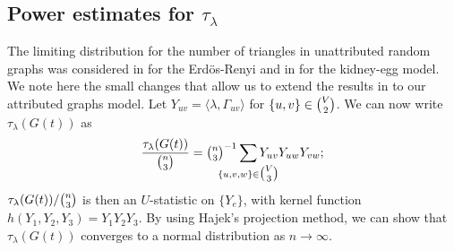 \documentclass[10pt,journal,compsoc]{IEEEtran}
\theoremstyle{definition}
\def\clap#1{\hbox to 0pt{\hss#1\hss}}
\def\mathclap{\mathpalette\mathclapinternal}
\def\mathclapinternal#1#2{%
\clap{$\mathsurround=0pt#1{#2}$}%
}
\begin{document}
\subsection{Power estimates for $\tau_{\lambda}$}
\label{sec:power-estim-tau_l}
The limiting distribution for the number of triangles in unattributed
random graphs was considered in
\cite{nowicki88:_subgr_u_statis_method} for the Erd\"{o}s-Renyi and in
\cite{rukhin09:_asymp_analy_various_statis_random_graph_infer} for the
kidney-egg model. We note here the small changes that allow us to
extend the results in
\cite{rukhin09:_asymp_analy_various_statis_random_graph_infer,%
nowicki88:_subgr_u_statis_method} to our attributed graphs model. Let
$Y_{uv} = \langle \lambda, \Gamma_{uv} \rangle$ for $\{u,v\} \in
\tbinom{V}{2}$. We can now write $\tau_{\lambda}(G(t))$ as
\begin{equation}
  \label{eq:45}
  \frac{\tau_{\lambda}(G(t))}{\tbinom{n}{3}} = \tbinom{n}{3}^{-1}
  \sum_{\mathclap{\{u,v,w\} \in \tbinom{V}{3}}} Y_{uv} Y_{uw} Y_{vw};
\end{equation}
$\tau_{\lambda}(G(t))/\tbinom{n}{3}$ is then an
$U$-statistic on $\{Y_{e}\}$, with kernel function $h(Y_{1}, Y_{2},
Y_{3}) = Y_{1} Y_{2} Y_{3}$. By using Hajek's projection method, we
can show that $\tau_{\lambda}(G(t))$ converges to a normal
distribution as $n \rightarrow \infty$. 
\end{document}
